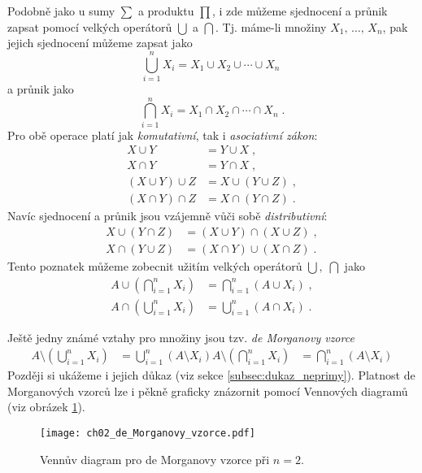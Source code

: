 Podobně jako u sumy $\sum$ a produktu $\prod$, i zde můžeme sjednocení a průnik zapsat pomocí velkých operátorů $\bigcup$ a $\bigcap$. Tj. máme-li množiny $X_1,\,\ldots,\,X_n$, pak jejich sjednocení můžeme zapsat jako
\begin{equation*}
    \bigcup\limits_{i=1}^{n}{X_i}=X_1 \cup X_2 \cup \cdots \cup X_n\;
\end{equation*}
a průnik jako
\begin{equation*}
    \bigcap\limits_{i=1}^{n}{X_i}=X_1 \cap X_2 \cap \cdots \cap X_n\; .
\end{equation*}
Pro obě operace platí jak \emph{komutativní}, tak i \emph{asociativní zákon}:
\begin{align*}
    X \cup Y&=Y \cup X\; ,\\
    X \cap Y&=Y \cap X\; ,\\
    (X \cup Y) \cup Z &= X \cup (Y \cup Z)\; ,\\
    (X \cap Y) \cap Z &= X \cap (Y \cap Z)\; .
\end{align*}
Navíc sjednocení a průnik jsou vzájemně vůči sobě \emph{distributivní}:
\begin{align*}
    X \cup (Y \cap Z) &= (X \cup Y) \cap (X \cup Z)\; ,\\
    X \cap (Y \cup Z) &= (X \cap Y) \cup (X \cap Z)\; .
\end{align*}
Tento poznatek můžeme zobecnit užitím velkých operátorů $\bigcup,\;\bigcap$ jako
\begin{align*}
    A \cup \left(\bigcap\limits_{i=1}^{n}{X_i}\right)&=\bigcap\limits_{i=1}^{n}{(A \cup X_i)}\; ,\\
    A \cap \left(\bigcup\limits_{i=1}^{n}{X_i}\right)&=\bigcup\limits_{i=1}^{n}{(A \cap X_i)}\; .
\end{align*}

Ještě jedny známé vztahy pro množiny jsou tzv. \emph{de Morganovy vzorce}
\begin{align*}
    A \setminus \left(\bigcup\limits_{i=1}^{n}{X_i}\right)&= \bigcup\limits_{i=1}^{n}{(A \setminus X_i)}
    A \setminus \left(\bigcap\limits_{i=1}^{n}{X_i}\right)&= \bigcap\limits_{i=1}^{n}{(A \setminus X_i)}
\end{align*}
Později si ukážeme i jejich důkaz (viz sekce \ref{subsec:dukaz_neprimy}). Platnost de Morganových vzorců lze i pěkně graficky znázornit pomocí Vennových diagramů (viz obrázek \ref{fig:vennuv_diagram_de_morgan}).
\begin{figure}[h]\label{fig:vennuv_diagram_de_morgan}
	\centering
	\texttt{[image: ch02\_de\_Morganovy\_vzorce.pdf]}
    \caption{Vennův diagram pro de Morganovy vzorce při $n=2$.}
\end{figure}

